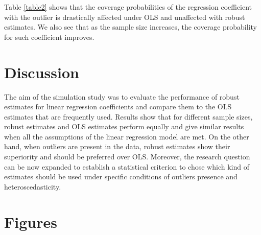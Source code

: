 \documentclass[a4paper]{article}
\begin{document}
\noindent
Table \ref{table2} shows that the coverage probabilities of the regression coefficient with the outlier is drastically affected under OLS and unaffected with robust estimates. We also see that as the sample size increases, the coverage probability for such coefficient improves.

\section{Discussion}
The aim of the simulation study was to evaluate the performance of robust estimates for linear regression coefficients and compare them to the OLS estimates that are frequently used. Results show that for different sample sizes, robust estimates and OLS estimates perform equally and give similar results when all the assumptions of the linear regression model are met. On the other hand, when outliers are present in the data, robust estimates show their superiority and should be preferred over OLS. Moreover, the research question can be now expanded to establish a statistical criterion to chose which kind of estimates should be used under specific conditions of outliers presence and heteroscedasticity. 

\newpage



\newpage

\section*{Figures} \label{Figures}
\end{document}
